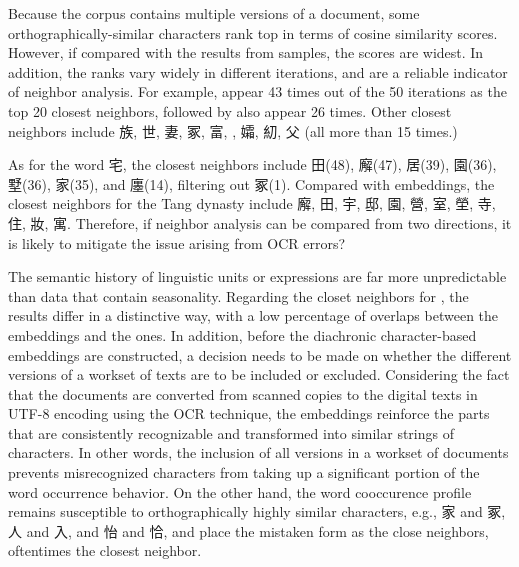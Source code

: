 Because the corpus contains multiple versions of a document, some orthographically-similar characters rank top in terms of cosine similarity scores. However, if compared with the results from  samples, the scores are widest. In addition, the ranks vary widely in different iterations, and are a reliable indicator of neighbor analysis. For example,  appear 43 times out of the 50 iterations as the top 20 closest neighbors, followed by  also appear 26 times. Other closest neighbors include 族, 世, 妻, 冢, 富, , 孀, 糿, 父 (all more than 15 times.)

As for the word 宅, the closest neighbors include 田(48), 廨(47), 居(39), 園(36), 墅(36), 家(35), and 廛(14), filtering out 冢(1). Compared with  embeddings, the closest neighbors for the Tang dynasty include 廨, 田, 宇, 邸, 園, 營, 室, 塋, 寺, 住, 妝, 寓. Therefore, if neighbor analysis can be compared from two directions, it is likely to mitigate the issue arising from OCR errors?

The semantic history of linguistic units or expressions are far more unpredictable than data that contain seasonality. Regarding the closet neighbors for \jia , the results differ in a distinctive way, with a low percentage of overlaps between the  embeddings and the  ones. In addition, before the diachronic character-based embeddings are constructed, a decision needs to be made on whether the different versions of a workset of texts are to be included or excluded. Considering the fact that the documents are converted from scanned copies to the digital texts in UTF-8 encoding using the OCR technique, the  embeddings reinforce the parts that are consistently recognizable and transformed into similar strings of characters. In other words, the inclusion of all versions in a workset of documents prevents misrecognized characters from taking up a significant portion of the word occurrence behavior. On the other hand, the word cooccurence profile remains susceptible to orthographically highly similar characters, e.g., 家 and 冢, 人 and 入, and 怡 and 恰, and place the mistaken form as the close neighbors, oftentimes the closest neighbor.

